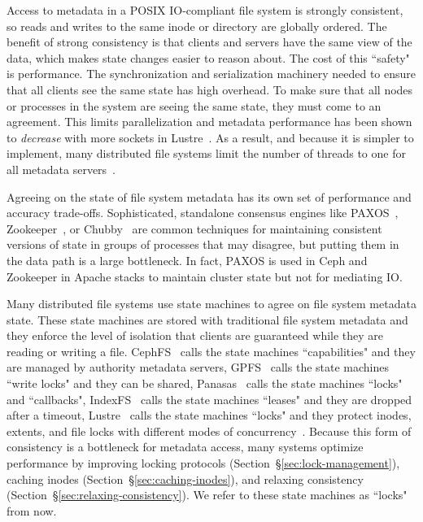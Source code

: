 Access to metadata in a POSIX IO-compliant file system is strongly consistent,
so reads and writes to the same inode or directory are globally ordered.  The
benefit of strong consistency is that clients and servers have the same view of
the data, which makes state changes easier to reason about.  The cost of this
``safety" is performance.  The synchronization and serialization machinery
needed to ensure that all clients see the same state has high overhead.  To
make sure that all nodes or processes in the system are seeing the same state,
they must come to an agreement.  This limits parallelization and metadata
performance has been shown to {\it decrease} with more sockets in
Lustre~\cite{konstantinos:pdsw2014-lustre-metadata}. As a result, and because
it is simpler to implement, many distributed file systems limit the number of
threads to one for all metadata servers~\cite{weil:osdi2006-ceph,
alam:pdsw2011-metadata-scaling, ren:sc2014-indexfs}. 

Agreeing on the state of file system metadata has its own set of performance and accuracy trade-offs.
Sophisticated, standalone consensus engines like
PAXOS~\cite{lamport_parttime_1998}, Zookeeper~\cite{hunt_zookeeper_2010}, or
Chubby~\cite{burrows_chubby_2006} are common techniques for maintaining
consistent versions of state in groups of processes that may disagree, but
putting them in the data path is a large bottleneck. In fact, PAXOS is used in
Ceph and Zookeeper in Apache stacks to maintain cluster state but not for
mediating IO.  

Many distributed file systems use state machines to agree on file system
metadata state.  These state machines are stored with traditional file system
metadata and they enforce the level of isolation that clients are guaranteed
while they are reading or writing a file. CephFS~\cite{docs:cephcaps,
weil:phdthesis07} calls the state machines ``capabilities" and they are managed
by authority metadata servers, GPFS~\cite{schmuck:fast2002-gpfs} calls the
state machines ``write locks" and they can be shared,
Panasas~\cite{welch:fast08-panasas} calls the state machines ``locks" and
``callbacks", IndexFS~\cite{ren:sc2014-indexfs} calls the state machines
``leases" and they are dropped after a timeout,
Lustre~\cite{schwan_lustre_2003} calls the state machines ``locks" and they
protect inodes, extents, and file locks with different modes of
concurrency~\cite{wang:tech09-lustre}.  Because this form of consistency is a
bottleneck for metadata access, many systems optimize performance by improving
locking protocols (Section~\S\ref{sec:lock-management}), caching inodes
(Section~\S\ref{sec:caching-inodes}), and relaxing consistency
(Section~\S\ref{sec:relaxing-consistency}). We refer to these state machines as
``locks" from now.

